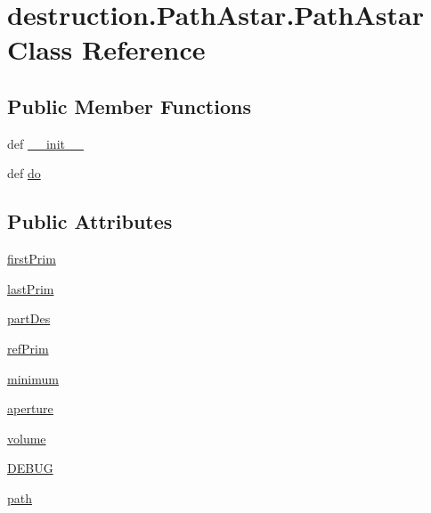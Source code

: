 \hypertarget{classdestruction_1_1_path_astar_1_1_path_astar}{\section{destruction.\-Path\-Astar.\-Path\-Astar Class Reference}
\label{classdestruction_1_1_path_astar_1_1_path_astar}
}
\subsection*{Public Member Functions}
\begin{DoxyCompactItemize}
\item 
def \hyperlink{classdestruction_1_1_path_astar_1_1_path_astar_a265c40a57e06be359569420f6a8f7bad}{\-\_\-\-\_\-init\-\_\-\-\_\-}
\item 
def \hyperlink{classdestruction_1_1_path_astar_1_1_path_astar_aa1bd8911f54d8849df7deab66cc13213}{do}
\end{DoxyCompactItemize}
\subsection*{Public Attributes}
\begin{DoxyCompactItemize}
\item 
\hyperlink{classdestruction_1_1_path_astar_1_1_path_astar_af1fe313e939626eaf2d298f331475a02}{first\-Prim}
\item 
\hyperlink{classdestruction_1_1_path_astar_1_1_path_astar_af7205b773c059e5902d9f1f92d0df3ac}{last\-Prim}
\item 
\hyperlink{classdestruction_1_1_path_astar_1_1_path_astar_ae376b961650c3c2c699417ff6f4748c7}{part\-Des}
\item 
\hyperlink{classdestruction_1_1_path_astar_1_1_path_astar_a606d76eba57d33789a03f85d544a4bad}{ref\-Prim}
\item 
\hyperlink{classdestruction_1_1_path_astar_1_1_path_astar_a383cee0d89ca6073036ed0f0d62419cb}{minimum}
\item 
\hyperlink{classdestruction_1_1_path_astar_1_1_path_astar_a03f41852fefe26a3ecceafcaabbff2f6}{aperture}
\item 
\hyperlink{classdestruction_1_1_path_astar_1_1_path_astar_a075b130f210377548d5652f38467f9f1}{volume}
\item 
\hyperlink{classdestruction_1_1_path_astar_1_1_path_astar_afcf3b6153983fd43914b8239250e7b16}{D\-E\-B\-U\-G}
\item 
\hyperlink{classdestruction_1_1_path_astar_1_1_path_astar_a6ca993cc5fca8f71374ee68e572043ee}{path}
\end{DoxyCompactItemize}


